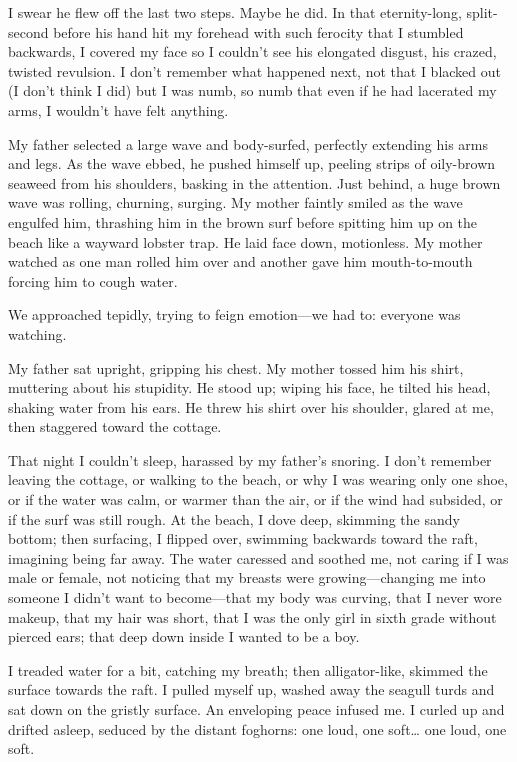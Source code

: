 I swear he flew off the last two steps. Maybe he did. In that
eternity-long, split-second before his hand hit my forehead with such
ferocity that I stumbled backwards, I covered my face so I couldn't see
his elongated disgust, his crazed, twisted revulsion. I don't remember
what happened next, not that I blacked out (I don't think I did) but I
was numb, so numb that even if he had lacerated my arms, I wouldn't have
felt anything.

My father selected a large wave and body-surfed, perfectly extending his
arms and legs. As the wave ebbed, he pushed himself up, peeling strips
of oily-brown seaweed from his shoulders, basking in the attention. Just
behind, a huge brown wave was rolling, churning, surging. My mother
faintly smiled as the wave engulfed him, thrashing him in the brown surf
before spitting him up on the beach like a wayward lobster trap. He laid
face down, motionless. My mother watched as one man rolled him over and
another gave him mouth-to-mouth forcing him to cough water.

We approached tepidly, trying to feign emotion---we had to: everyone was
watching.

My father sat upright, gripping his chest. My mother tossed him his
shirt, muttering about his stupidity. He stood up; wiping his face, he
tilted his head, shaking water from his ears. He threw his shirt over
his shoulder, glared at me, then staggered toward the cottage.

That night I couldn't sleep, harassed by my father's snoring. I don't
remember leaving the cottage, or walking to the beach, or why I was
wearing only one shoe, or if the water was calm, or warmer than the air,
or if the wind had subsided, or if the surf was still rough. At the
beach, I dove deep, skimming the sandy bottom; then surfacing, I flipped
over, swimming backwards toward the raft, imagining being far away. The
water caressed and soothed me, not caring if I was male or female, not
noticing that my breasts were growing---changing me into someone I
didn't want to become---that my body was curving, that I never wore
makeup, that my hair was short, that I was the only girl in sixth grade
without pierced ears; that deep down inside I wanted to be a boy.

I treaded water for a bit, catching my breath; then alligator-like,
skimmed the surface towards the raft. I pulled myself up, washed away
the seagull turds and sat down on the gristly surface. An enveloping
peace infused me. I curled up and drifted asleep, seduced by the distant
foghorns: one loud, one soft\ldots{} one loud, one soft.

